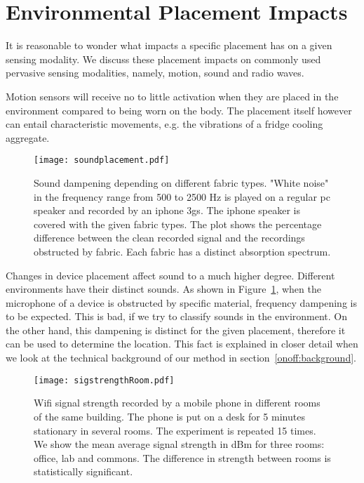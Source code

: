 \section{Environmental Placement Impacts}
It is reasonable to wonder what
impacts a specific placement has on a given sensing modality. We discuss these placement impacts on commonly
used pervasive sensing modalities, namely, motion, sound and radio
waves.

Motion sensors will receive no to little activation when they are
placed in the environment compared to being worn on the body. The
placement itself however can entail characteristic movements, e.g. the
vibrations of a fridge cooling aggregate.

\begin{figure}[t]
  \begin{center}
  \texttt{[image: soundplacement.pdf]}
	\end{center}
\caption[Fabric dependent sound dampening]{Sound dampening depending on different fabric types. "White
 noise" in the frequency range from 500 to 2500 Hz is played on a
 regular pc speaker and recorded by an iphone 3gs. The iphone speaker
 is covered with the given fabric types. The plot shows the
 percentage difference between the clean recorded signal and the
 recordings obstructed by fabric. Each fabric has a distinct absorption spectrum.}
\label{fig:soundplacement}
\end{figure}

Changes in device placement affect sound to a much higher degree.
Different environments have their distinct sounds. As shown in
Figure~\ref{fig:soundplacement}, when the microphone of a device is
obstructed by specific material, frequency dampening is to be
expected. This is bad, if we try to classify sounds in the
environment. On the other hand, this dampening is distinct for the
given placement, therefore it can be used to determine the
location. This fact is explained in closer detail when we look at the
technical background of our method in section~\ref{onoff:background}.

\begin{figure}[t]
  \begin{center}
  \texttt{[image: sigstrengthRoom.pdf]}
	\end{center}
\caption[Wifi signal strength for different rooms]{Wifi signal strength recorded by a mobile phone in
 different rooms of the same building. The phone is put on a desk
 for 5 minutes stationary in several rooms. The experiment is
 repeated 15 times. We show the mean average signal strength in dBm
  for three rooms: office, lab and commons. The difference in strength between rooms is statistically
 significant.}
\label{fig:sigstrength1}
\end{figure}

